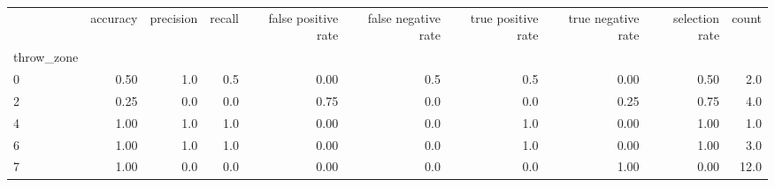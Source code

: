 \begin{tabular}{lrrrrrrrrr}
\toprule
{} &  accuracy &  precision &  recall &  false positive rate &  false negative rate &  true positive rate &  true negative rate &  selection rate &  count \\
throw\_zone &           &            &         &                      &                      &                     &                     &                 &        \\
\midrule
0          &      0.50 &        1.0 &     0.5 &                 0.00 &                  0.5 &                 0.5 &                0.00 &            0.50 &    2.0 \\
2          &      0.25 &        0.0 &     0.0 &                 0.75 &                  0.0 &                 0.0 &                0.25 &            0.75 &    4.0 \\
4          &      1.00 &        1.0 &     1.0 &                 0.00 &                  0.0 &                 1.0 &                0.00 &            1.00 &    1.0 \\
6          &      1.00 &        1.0 &     1.0 &                 0.00 &                  0.0 &                 1.0 &                0.00 &            1.00 &    3.0 \\
7          &      1.00 &        0.0 &     0.0 &                 0.00 &                  0.0 &                 0.0 &                1.00 &            0.00 &   12.0 \\
\bottomrule
\end{tabular}
